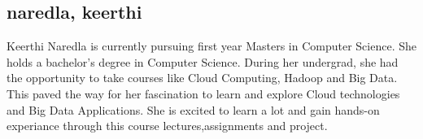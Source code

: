 \subsection{naredla, keerthi}

Keerthi Naredla is currently pursuing first year Masters in Computer Science. She holds a bachelor’s degree in Computer Science. 
During her undergrad, she had the opportunity to take courses like Cloud Computing, Hadoop and Big Data. This paved the way  for her 
fascination to learn and explore Cloud technologies and Big Data Applications. She is excited  to learn a lot and gain hands-on experiance 
through this course lectures,assignments and project.
